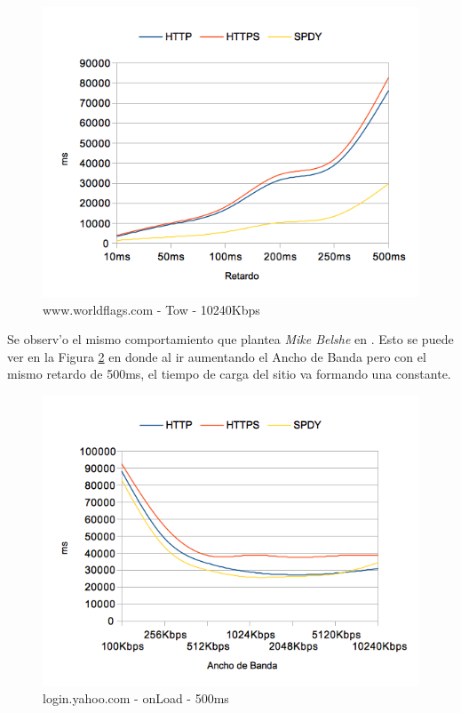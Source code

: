 \documentclass[a4paper,11pt,twocolumn]{article}
\begin{document}
\begin{figure}[h!]
  	\centering
	\includegraphics[scale=0.65]{exp1_4}
	\caption{\small www.worldflags.com - Tow - 10240Kbps}
	\label{graf4}
\end{figure}

Se observ'o el mismo comportamiento que plantea \emph{Mike Belshe} en \cite{moreBand}. Esto se puede ver en la Figura \ref{graf5} en donde al ir aumentando el Ancho de Banda pero con el mismo retardo de 500ms, el tiempo de carga del sitio va formando una constante.

\begin{figure}[h!]
  	\centering
	\includegraphics[scale=0.65]{exp1_5}
	\caption{\small login.yahoo.com - onLoad - 500ms}
	\label{graf5}
\end{figure}
\end{document}
